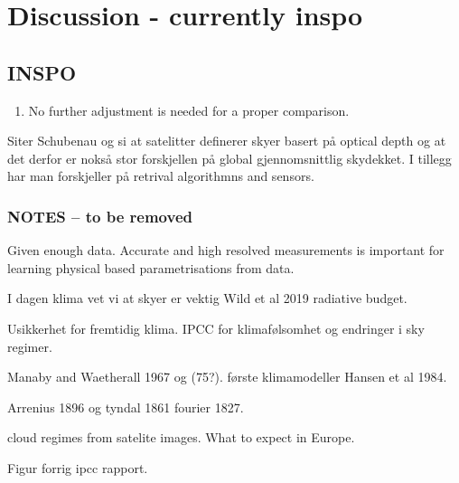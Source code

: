 \chapter{Discussion - currently inspo}
\section{INSPO}
\begin{enumerate}
    \item No further adjustment is needed for a proper comparison.
\end{enumerate}

Siter Schubenau og si at satelitter definerer skyer basert på optical depth og at det derfor er nokså stor forskjellen på global gjennomsnittlig skydekket. I tillegg har man forskjeller på retrival algorithmns and sensors. 

\subsection{NOTES -- to be removed}
Given enough data. Accurate and high resolved measurements is important for learning physical based parametrisations from data. 

I dagen klima vet vi at skyer er vektig
Wild et al 2019 radiative budget.

Usikkerhet for fremtidig klima.
IPCC for klimafølsomhet og endringer i sky regimer. 

Manaby and Waetherall 1967 og (75?). første klimamodeller 
Hansen et al 1984.

Arrenius 1896 og tyndal 1861 fourier 1827.

cloud regimes from satelite images. What to expect in Europe. 

Figur forrig ipcc rapport. 

